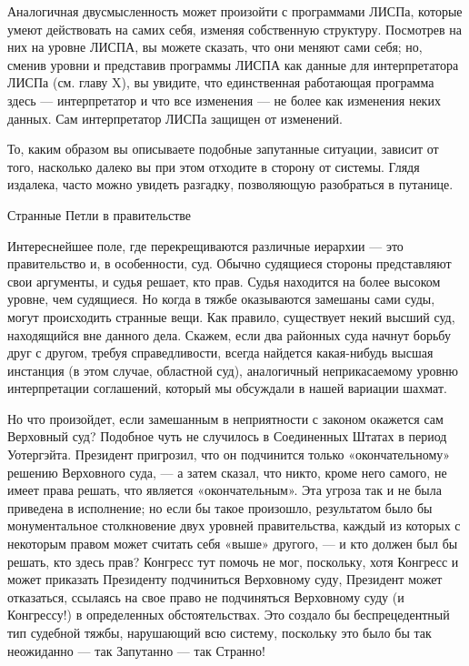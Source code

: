 \documentclass[../main.tex]{subfiles}
\begin{document}
Аналогичная двусмысленность может произойти с программами ЛИСПа, которые умеют действовать на самих себя, изменяя собственную структуру. Посмотрев на них на уровне ЛИСПА, вы можете сказать, что они меняют сами себя; но, сменив уровни и представив программы ЛИСПА как данные для интерпретатора ЛИСПа (см. главу X), вы увидите, что единственная работающая программа здесь --- интерпретатор и что все изменения --- не более как изменения неких данных. Сам интерпретатор ЛИСПа защищен от изменений.

То, каким образом вы описываете подобные запутанные ситуации, зависит от того, насколько далеко вы при этом отходите в сторону от системы. Глядя издалека, часто можно увидеть разгадку, позволяющую разобраться в путанице.

Странные Петли в правительстве

Интереснейшее поле, где перекрещиваются различные иерархии --- это правительство и, в особенности, суд. Обычно судящиеся стороны представляют свои аргументы, и судья решает, кто прав. Судья находится на более высоком уровне, чем судящиеся. Но когда в тяжбе оказываются замешаны сами суды, могут происходить странные вещи. Как правило, существует некий высший суд, находящийся вне данного дела. Скажем, если два районных суда начнут борьбу друг с другом, требуя справедливости, всегда найдется какая-нибудь высшая инстанция (в этом случае, областной суд), аналогичный неприкасаемому уровню интерпретации соглашений, который мы обсуждали в нашей вариации шахмат.

Но что произойдет, если замешанным в неприятности с законом окажется сам Верховный суд? Подобное чуть не случилось в Соединенных Штатах в период Уотергэйта. Президент пригрозил, что он подчинится только «окончательному» решению Верховного суда, --- а затем сказал, что никто, кроме него самого, не имеет права решать, что является «окончательным». Эта угроза так и не была приведена в исполнение; но если бы такое произошло, результатом было бы монументальное столкновение двух уровней правительства, каждый из которых с некоторым правом может считать себя «выше» другого, --- и кто должен был бы решать, кто здесь прав? Конгресс тут помочь не мог, поскольку, хотя Конгресс и может приказать Президенту подчиниться Верховному суду, Президент может отказаться, ссылаясь на свое право не подчиняться Верховному суду (и Конгрессу!) в определенных обстоятельствах. Это создало бы беспрецедентный тип судебной тяжбы, нарушающий всю систему, поскольку это было бы так неожиданно --- так Запутанно --- так Странно!
\end{document}
